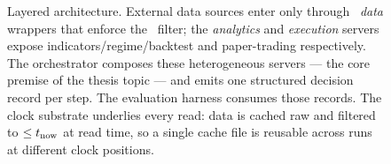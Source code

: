 \begin{figure}[t]
  \caption[Layered system architecture]{Layered architecture. External data sources enter
  only through \mcp\ \emph{data} wrappers that enforce the \tnow\ filter; the \emph{analytics}
  and \emph{execution} servers expose indicators/regime/backtest and paper-trading
  respectively. The orchestrator composes these heterogeneous servers --- the core premise of
  the thesis topic --- and emits one structured decision record per step. The evaluation
  harness consumes those records. The clock substrate underlies every read: data is cached
  raw and filtered to $\le t_{\text{now}}$ at read time, so a single cache file is reusable across
  runs at different clock positions.}
  \label{fig:architecture}
\end{figure}
